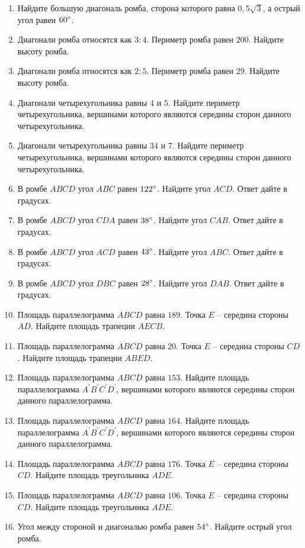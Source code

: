 \documentclass[12pt, a4paper]{article}
\begin{document}
\begin{enumerate}
		\item Найдите большую диагональ ромба, сторона которого равна \( 0,5\sqrt{3} \), а острый угол равен \( 60 \degree\).
		\item Диагонали ромба относятся как \( 3:4 \). Периметр ромба равен \( 200 \). Найдите высоту ромба.
		\item Диагонали ромба относятся как \( 2 : 5 \). Периметр ромба равен \( 29 \). Найдите высоту ромба.
		\item Диагонали четырехугольника равны \( 4  \) и \( 5 \). Найдите периметр четырехугольника, вершинами которого являются середины сторон данного четырехугольника.
		\item Диагонали четырехугольника равны \( 34  \) и \( 7 \). Найдите периметр четырехугольника, вершинами которого являются середины сторон данного четырехугольника.
		\item В ромбе \( ABCD  \) угол \( ABC  \) равен \( 122\degree \). Найдите угол \( ACD \). Ответ дайте в градусах.
		\item В ромбе \( ABCD \) угол \( CDA \) равен \( 38\degree \). Найдите угол \( CAB \). Ответ дайте в градусах.
		\item В ромбе \( ABCD \) угол \( ACD \) равен \( 43\degree \). Найдите угол \( ABC \). Ответ дайте в градусах.
		\item В ромбе \( ABCD \) угол \( DBC \) равен \( 28\degree \). Найдите угол \( DAB \). Ответ дайте в градусах.
		\item Площадь параллелограмма \( ABCD \) равна \( 189 \). Точка \( E \) – середина стороны \( AD \). Найдите площадь трапеции \( AECB \).
		\item Площадь параллелограмма \( ABCD \) равна \(20\). Точка \( E \) – середина стороны \(CD\). Найдите площадь трапеции \(ABED\).
		\item Площадь параллелограмма \(ABCD\) равна \(153\). Найдите площадь параллелограмма \( A^{'} B^{'} C^{'} D^{'} \), вершинами которого являются середины сторон данного параллелограмма.
		\item Площадь параллелограмма \(ABCD\) равна \( 164 \). Найдите площадь параллелограмма \( A^{'} B^{'} C^{'} D^{'} \), вершинами которого являются середины сторон данного параллелограмма.
		\item Площадь параллелограмма \( ABCD \) равна \( 176 \). Точка \( E \) – середина стороны \( CD \). Найдите площадь треугольника \( ADE \).
		\item Площадь параллелограмма \( ABCD \) равна \( 106 \). Точка \( E \) – середина стороны \( CD \). Найдите площадь треугольника \( ADE \).
		\item Угол между стороной и диагональю ромба равен \( 54\degree \). Найдите острый угол ромба.
	\end{enumerate}
\end{document}

